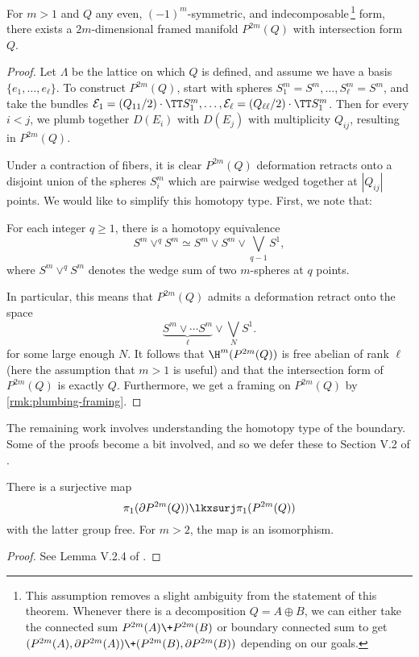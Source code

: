 \begin{proposition}\label{thm:plumbing-existence-theorem}
	For $m>1$ and $Q$ any even, $(-1)^m$-symmetric, and indecomposable\,\footnote{This assumption removes a slight ambiguity from the statement of this theorem. Whenever there is a decomposition $Q=A\oplus B$, we can either take the connected sum $P^{2m}(A)\+P^{2m}(B)$ or boundary connected sum to get $(P^{2m}(A),\partial P^{2m}(A))\+ (P^{2m}(B),\partial P^{2m}(B))$ depending on our goals.} form, there exists a $2m$-dimensional framed manifold $P^{2m}(Q)$ with intersection form $Q$.
\end{proposition}

\begin{proof}
	Let $\Lambda$ be the lattice on which $Q$ is defined, and assume we have a basis $\{e_1,\ldots, e_\ell\}$. To construct $P^{2m}(Q)$, start with spheres $S_1^m=S^m,\ldots, S_\ell^m=S^m$, and take the bundles $\mathcal{E}_1=(Q_{11}/2)\cdot \TT S^m_1,\ldots, \mathcal{E}_\ell=(Q_{\ell\ell}/2)\cdot \TT S^m_1$. Then for every $i<j$, we plumb together $D(E_i)$ with $D(E_j)$ with multiplicity $Q_{ij}$, resulting in $P^{2m}(Q)$.

	Under a contraction of fibers, it is clear $P^{2m}(Q)$ deformation retracts onto a disjoint union of the spheres $S^m_i$ which are pairwise wedged together at $|Q_{ij}|$ points. We would like to simplify this homotopy type. First, we note that:
	\begin{lemma}
		For each integer $q\geq 1$, there is a homotopy equivalence
		\[
			S^m\vee^q S^m \simeq S^m\vee S^m \vee \bigvee_{q-1} S^1,
		\]
		where $S^m\vee^q S^m$ denotes the wedge sum of two $m$-spheres at $q$ points.
	\end{lemma}

	In particular, this means that $P^{2m}(Q)$ admits a deformation retract onto the space
	\[
		\underbrace{S^m\vee\cdots S^m}_{\ell}\vee \bigvee_N S^1.
	\]
	for some large enough $N$. It follows that $\H^m(P^{2m}(Q))$ is free abelian of rank $\ell$ (here the assumption that $m>1$ is useful) and that the intersection form of $P^{2m}(Q)$ is exactly $Q$. Furthermore, we get a framing on $P^{2m}(Q)$ by \cref{rmk:plumbing-framing}.
\end{proof}

The remaining work involves understanding the homotopy type of the boundary. Some of the proofs become a bit involved, and so we defer these to Section V.2 of \cite{browder1972surgery}.

\begin{proposition}
	There is a surjective map 
	\[\pi_1(\partial P^{2m}(Q))\lkxsurj \pi_1(P^{2m}(Q))\]
	with the latter group free. For $m>2$, the map is an isomorphism.
\end{proposition}
\begin{proof}
	See Lemma V.2.4 of \cite{browder1972surgery}.
\end{proof}

